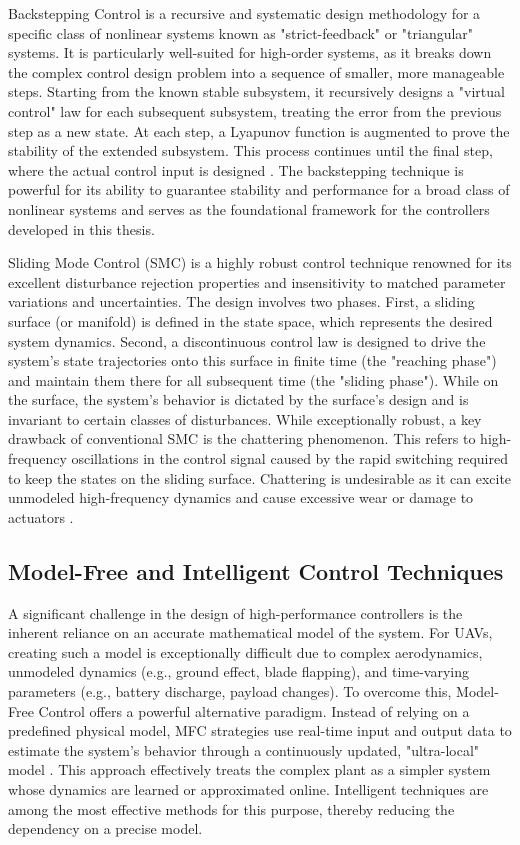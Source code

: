 Backstepping Control is a recursive and systematic design methodology for a specific class of nonlinear systems known as "strict-feedback" or "triangular" systems. It is particularly well-suited for high-order systems, as it breaks down the complex control design problem into a sequence of smaller, more manageable steps. Starting from the known stable subsystem, it recursively designs a "virtual control" law for each subsequent subsystem, treating the error from the previous step as a new state. At each step, a Lyapunov function is augmented to prove the stability of the extended subsystem. This process continues until the final step, where the actual control input is designed \cite{bsc1,bsc2,bsc3}. The backstepping technique is powerful for its ability to guarantee stability and performance for a broad class of nonlinear systems and serves as the foundational framework for the controllers developed in this thesis.

Sliding Mode Control (SMC) is a highly robust control technique renowned for its excellent disturbance rejection properties and insensitivity to matched parameter variations and uncertainties. The design involves two phases. First, a sliding surface (or manifold) is defined in the state space, which represents the desired system dynamics. Second, a discontinuous control law is designed to drive the system's state trajectories onto this surface in finite time (the "reaching phase") and maintain them there for all subsequent time (the "sliding phase"). While on the surface, the system's behavior is dictated by the surface's design and is invariant to certain classes of disturbances. While exceptionally robust, a key drawback of conventional SMC is the chattering phenomenon. This refers to high-frequency oscillations in the control signal caused by the rapid switching required to keep the states on the sliding surface. Chattering is undesirable as it can excite unmodeled high-frequency dynamics and cause excessive wear or damage to actuators  \cite{smc1,smc2,smc3}.

\subsection{Model-Free and Intelligent Control Techniques}
A significant challenge in the design of high-performance controllers is the inherent reliance on an accurate mathematical model of the system. For UAVs, creating such a model is exceptionally difficult due to complex aerodynamics, unmodeled dynamics (e.g., ground effect, blade flapping), and time-varying parameters (e.g., battery discharge, payload changes). To overcome this, Model-Free Control offers a powerful alternative paradigm. Instead of relying on a predefined physical model, MFC strategies use real-time input and output data to estimate the system's behavior through a continuously updated, "ultra-local" model  \cite{mfc1,mfc2,mfc3}. This approach effectively treats the complex plant as a simpler system whose dynamics are learned or approximated online. Intelligent techniques are among the most effective methods for this purpose, thereby reducing the dependency on a precise model.

